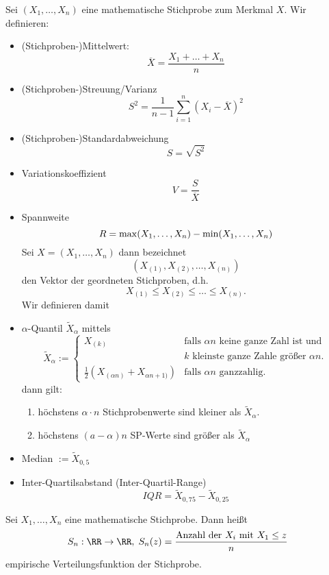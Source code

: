 \documentclass{scrreprt}
\begin{document}
 Sei $(X_1, \ldots, X_n)$ eine mathematische Stichprobe zum Merkmal $X$. Wir definieren:
\begin{itemize}
\item (Stichproben-)Mittelwert:
$$\overline{X}=\frac{X_1+\ldots + X_n}{n}$$
\item (Stichproben-)Streuung/Varianz
$$S^2=\frac{1}{n-1} \sum_{i=1}^n (X_i - \overline{X})^2$$
\item (Stichproben-)Standardabweichung
$$S=\sqrt{S^2}$$
\item Variationskoeffizient
$$V=\frac{S}{\overline{X}}$$
\item Spannweite
$$R=\max (X_1, \ldots, X_n) - \min (X_1, \ldots, X_n) \bigskip$$
Sei $X=(X_1, \ldots, X_n)$ dann bezeichnet 
$$(X_{(1)}, X_{(2)}, \ldots, X_{(n)})$$ 
den Vektor der geordneten Stichproben, d.h. 
$$X_{(1)}\leq X_{(2)} \leq \ldots \leq X_{(n)}\text{.}$$
Wir definieren damit
\item $\alpha$-Quantil $\widetilde{X}_\alpha$ mittels
$$\widetilde{X}_\alpha := \begin{cases}
X_{(k)} & \text{falls }\alpha n\text{ keine ganze Zahl ist und }\\
& k\text{ kleinste ganze Zahle größer }\alpha n\text{.}\\
\frac{1}{2}(X_{(\alpha n)}+X_{\alpha n+1)}) & \text{falls }\alpha n\text{ ganzzahlig.}
\end{cases}$$
dann gilt:
\begin{enumerate}
\item höchstens $\alpha \cdot n$ Stichprobenwerte sind kleiner als $\widetilde{X}_\alpha$.
\item höchstens $(a-\alpha) n$ SP-Werte sind größer als $\widetilde{X}_\alpha$
\end{enumerate}
\item Median $:=\widetilde{X}_{0,5}$
\item Inter-Quartilsabstand (Inter-Quartil-Range)
$$IQR = \widetilde{X}_{0,75}-\widetilde{X}_{0,25}$$
\end{itemize}

 Sei $X_1, \ldots, X_n$ eine mathematische Stichprobe. Dann heißt 
$$S_n: \RR \to \RR, \; S_n(z)= \frac{\text{Anzahl der }X_i\text{ mit } X_1 \leq z}{n}$$
empirische Verteilungsfunktion der Stichprobe.
\end{document}

